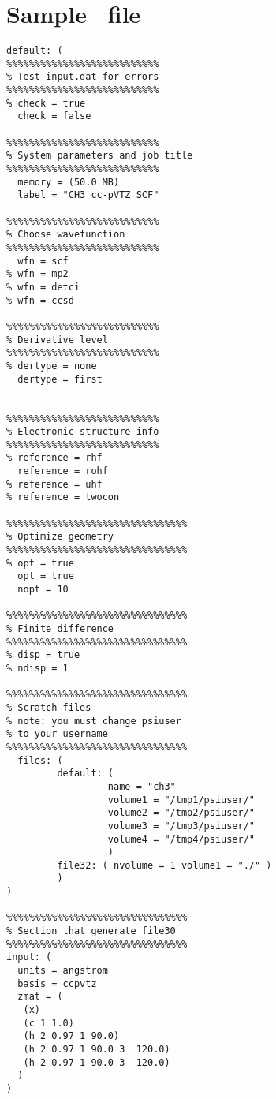 \section{Sample \ file}
\begin{verbatim}
default: (
%%%%%%%%%%%%%%%%%%%%%%%%%%%
% Test input.dat for errors
%%%%%%%%%%%%%%%%%%%%%%%%%%%
% check = true
  check = false

%%%%%%%%%%%%%%%%%%%%%%%%%%%
% System parameters and job title
%%%%%%%%%%%%%%%%%%%%%%%%%%%
  memory = (50.0 MB)
  label = "CH3 cc-pVTZ SCF"

%%%%%%%%%%%%%%%%%%%%%%%%%%%
% Choose wavefunction
%%%%%%%%%%%%%%%%%%%%%%%%%%%
  wfn = scf
% wfn = mp2
% wfn = detci
% wfn = ccsd

%%%%%%%%%%%%%%%%%%%%%%%%%%%
% Derivative level
%%%%%%%%%%%%%%%%%%%%%%%%%%%
% dertype = none
  dertype = first


%%%%%%%%%%%%%%%%%%%%%%%%%%%
% Electronic structure info
%%%%%%%%%%%%%%%%%%%%%%%%%%%
% reference = rhf
  reference = rohf
% reference = uhf
% reference = twocon

%%%%%%%%%%%%%%%%%%%%%%%%%%%%%%%%
% Optimize geometry 
%%%%%%%%%%%%%%%%%%%%%%%%%%%%%%%%
% opt = true
  opt = true
  nopt = 10

%%%%%%%%%%%%%%%%%%%%%%%%%%%%%%%%
% Finite difference
%%%%%%%%%%%%%%%%%%%%%%%%%%%%%%%%
% disp = true
% ndisp = 1

%%%%%%%%%%%%%%%%%%%%%%%%%%%%%%%%
% Scratch files
% note: you must change psiuser
% to your username
%%%%%%%%%%%%%%%%%%%%%%%%%%%%%%%%
  files: (
         default: (
                  name = "ch3"
                  volume1 = "/tmp1/psiuser/"
                  volume2 = "/tmp2/psiuser/"
                  volume3 = "/tmp3/psiuser/"
                  volume4 = "/tmp4/psiuser/"
                  )
         file32: ( nvolume = 1 volume1 = "./" )
         )
)

%%%%%%%%%%%%%%%%%%%%%%%%%%%%%%%%
% Section that generate file30
%%%%%%%%%%%%%%%%%%%%%%%%%%%%%%%%
input: (
  units = angstrom
  basis = ccpvtz
  zmat = (
   (x)
   (c 1 1.0)
   (h 2 0.97 1 90.0)
   (h 2 0.97 1 90.0 3  120.0)
   (h 2 0.97 1 90.0 3 -120.0)
  )
)
\end{verbatim}

